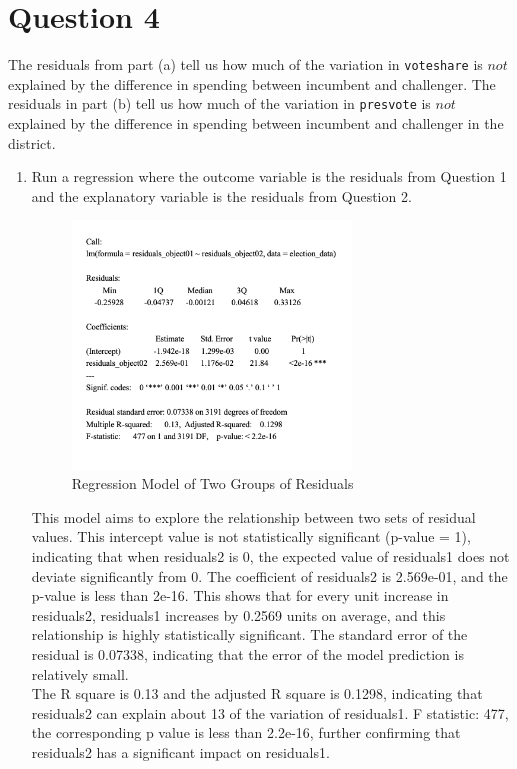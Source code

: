 \documentclass[12pt,letterpaper]{article}
\begin{document}
\newpage	
\section*{Question 4}
\noindent The residuals from part (a) tell us how much of the variation in \texttt{voteshare} is $not$ explained by the difference in spending between incumbent and challenger. The residuals in part (b) tell us how much of the variation in \texttt{presvote} is $not$ explained by the difference in spending between incumbent and challenger in the district.
	\begin{enumerate}
		\item Run a regression where the outcome variable is the residuals from Question 1 and the explanatory variable is the residuals from Question 2.	\vspace{1cm}
		

	\begin{figure}[h!]
	\caption{\footnotesize{Regression Model of Two Groups of Residuals}}
	\vspace{.5cm}
	\centering
	\label{fig:4.1}
	\includegraphics[width=0.7\textwidth]{summary4.png}
	\end{figure}

This model aims to explore the relationship between two sets of residual values. This intercept value is not statistically significant (p-value = 1), indicating that when residuals2 is 0, the expected value of residuals1 does not deviate significantly from 0. The coefficient of residuals2 is 2.569e-01, and the p-value is less than 2e-16. This shows that for every unit increase in residuals2, residuals1 increases by 0.2569 units on average, and this relationship is highly statistically significant. The standard error of the residual is 0.07338, indicating that the error of the model prediction is relatively small.\\
The R square is 0.13 and the adjusted R square is 0.1298, indicating that residuals2 can explain about 13  of the variation of residuals1. F statistic: 477, the corresponding p value is less than 2.2e-16, further confirming that residuals2 has a significant impact on residuals1.\\


\end{enumerate}
\end{document}
